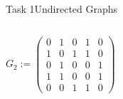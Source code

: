 \begin{frame}[allowframebreaks]{Task 1}{Undirected Graphs}
\begin{solutionnoinc}
\begin{columns}
      \begin{column}{0.5\textwidth}
      \end{column}
    \end{columns}
  \end{solutionnoinc}
  \begin{solution}
    \begin{columns}
      \begin{column}{0.5\textwidth}
        \centering
        $G_2 :=
        \begin{pmatrix}
        0 & 1 & 0 & 1 & 0 \\
        1 & 0 & 1 & 1 & 0 \\
        0 & 1 & 0 & 0 & 1 \\
        1 & 1 & 0 & 0 & 1 \\
        0 & 0 & 1 & 1 & 0
        \end{pmatrix}$
      \end{column}
      \begin{column}{0.5\textwidth}
      \end{column}
    \end{columns}
  \end{solution}
\end{frame}
